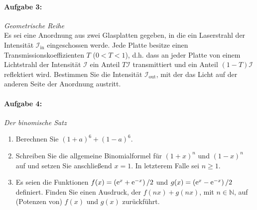 \paragraph{Aufgabe 3: } \emph{Geometrische Reihe}\\[0.2cm]
Es sei eine Anordnung aus zwei Glasplatten gegeben, in die ein Laserstrahl der Intensität $\mathcal{I}_\text{in}$ eingeschossen werde. Jede Platte besitze einen Transmissionskoeffizienten $T$ ($0<T<1$), d.h. dass an jeder Platte von einem Lichtstrahl der Intensität $\mathcal{I}$ ein Anteil $T \mathcal{I}$ transmittiert und ein Anteil $(1-T)\mathcal{I}$ reflektiert wird.
Bestimmen Sie die Intensität $\mathcal{I}_\text{out}$, mit der das Licht auf der anderen Seite der Anordnung austritt.\\
\begin{center}
    \vspace{-1cm}
\vspace{-2cm}
\end{center}
%
\newpage
\paragraph{Aufgabe 4: } \emph{Der binomische Satz}
\begin{enumerate}[label=(\alph*)]
\item Berechnen Sie $(1+a)^6+(1-a)^6$.
\item Schreiben Sie die allgemeine Binomialformel für $(1+x)^n$ und $(1-x)^n$ auf und setzen Sie anschließend $x=1$. In letzterem Falle sei $n\ge 1$.
\item Es seien die Funktionen $f(x)=\left(\mathrm{e}^{x}+\mathrm{e}^{-x}\right)/2$ und $g(x)=\left(\mathrm{e}^{x}-\mathrm{e}^{-x}\right)/2$ definiert. Finden Sie einen Ausdruck, der $f(nx)+g(nx)$, mit $n\in\mathbb{N}$, auf (Potenzen von) $f(x)$ und $g(x)$ zurückführt.
\end{enumerate}
%
